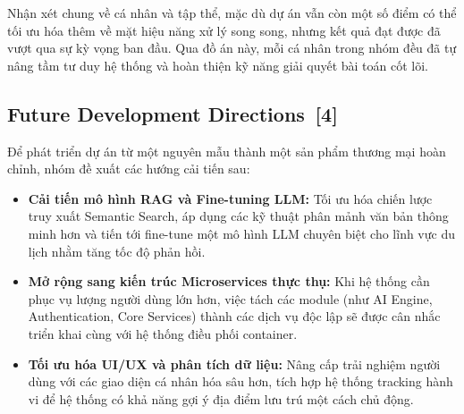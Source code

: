 \documentclass[12pt, a4paper]{article}
\begin{document}
Nhận xét chung về cá nhân và tập thể, mặc dù dự án vẫn còn một số điểm có thể tối ưu hóa thêm về mặt hiệu năng xử lý song song, nhưng kết quả đạt được đã vượt qua sự kỳ vọng ban đầu. Qua đồ án này, mỗi cá nhân trong nhóm đều đã tự nâng tầm tư duy hệ thống và hoàn thiện kỹ năng giải quyết bài toán cốt lõi.

\subsection[Future Development Directions]{Future Development Directions \,{\normalfont\small\textcolor{cyan!70!black}{[4]}}}
Để phát triển dự án từ một nguyên mẫu thành một sản phẩm thương mại hoàn chỉnh, nhóm đề xuất các hướng cải tiến sau:
\begin{itemize}
    \item \textbf{Cải tiến mô hình RAG và Fine-tuning LLM:} Tối ưu hóa chiến lược truy xuất Semantic Search, áp dụng các kỹ thuật phân mảnh văn bản thông minh hơn và tiến tới fine-tune một mô hình LLM chuyên biệt cho lĩnh vực du lịch nhằm tăng tốc độ phản hồi.
    \item \textbf{Mở rộng sang kiến trúc Microservices thực thụ:} Khi hệ thống cần phục vụ lượng người dùng lớn hơn, việc tách các module (như AI Engine, Authentication, Core Services) thành các dịch vụ độc lập sẽ được cân nhắc triển khai cùng với hệ thống điều phối container.
    \item \textbf{Tối ưu hóa UI/UX và phân tích dữ liệu:} Nâng cấp trải nghiệm người dùng với các giao diện cá nhân hóa sâu hơn, tích hợp hệ thống tracking hành vi để hệ thống có khả năng gợi ý địa điểm lưu trú một cách chủ động.
\end{itemize}
\end{document}
